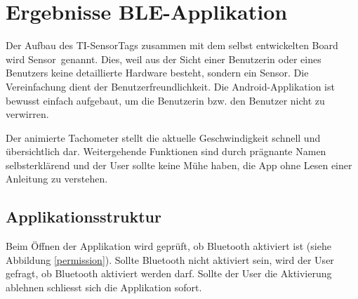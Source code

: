 %
%


\section{Ergebnisse BLE-Applikation}

Der Aufbau des TI-SensorTags zusammen mit dem selbst entwickelten Board wird \glqq Sensor\grqq\thinspace\ genannt. Dies, weil aus der Sicht einer Benutzerin oder eines Benutzers keine detaillierte Hardware besteht, sondern \glqq ein Sensor\grqq. Die Vereinfachung dient der Benutzerfreundlichkeit. Die Android-Applikation ist bewusst einfach aufgebaut, um die Benutzerin bzw. den Benutzer nicht zu verwirren. 

Der animierte Tachometer stellt die aktuelle Geschwindigkeit schnell und übersichtlich dar. Weitergehende Funktionen sind durch prägnante Namen selbsterklärend und der User sollte keine Mühe haben, die App ohne Lesen einer Anleitung zu verstehen.

\subsection{Applikationsstruktur}

Beim Öffnen der Applikation wird geprüft, ob Bluetooth aktiviert ist (siehe Abbildung \ref{permission}). Sollte Bluetooth nicht aktiviert sein, wird der User gefragt, ob Bluetooth aktiviert werden darf. Sollte der User die Aktivierung ablehnen schliesst sich die Applikation sofort.

